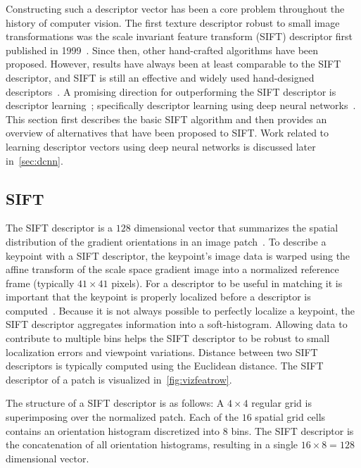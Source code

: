     Constructing such a descriptor vector has been a core problem throughout the history of computer vision.
    The first texture descriptor robust to small image transformations was the scale invariant feature
      transform (SIFT) descriptor first published in 1999~\cite{lowe_object_1999, lowe_distinctive_2004}.
    Since then, other hand-crafted algorithms have been proposed.
    However, results have always been at least comparable to the SIFT descriptor, and SIFT is still an effective
      and widely used hand-designed descriptors~\cite{mikolajczyk_performance_2005, calonder_brief_2010,
      bay_surf_2006, leutenegger_brisk_2011, alahi_freak_2012, jegou_triangulation_2014}.
    A promising direction for outperforming the SIFT descriptor is descriptor
      learning~\cite{simonyan_descriptor_2012, simonyan_learning_2014, winder_picking_2009}; specifically
      descriptor learning using deep neural networks~\cite{razavian_cnn_2014, bengio_representation_2013,
      russakovsky_imagenet_2014}.
    This section first describes the basic SIFT algorithm and then provides an overview of alternatives that have
      been proposed to SIFT{}.
    Work related to learning descriptor vectors using deep neural networks is discussed later in~\cref{sec:dcnn}.
      
    \subsection{SIFT}
        The {SIFT descriptor} is a $128$ dimensional vector that summarizes the spatial distribution of the
        gradient orientations in an image patch~\cite{lowe_distinctive_2004}. To describe a keypoint with a SIFT
        descriptor, the keypoint's image data is warped using the affine transform of the scale space gradient
        image into a normalized reference frame (typically $41 \times 41$ pixels). For a descriptor to be useful in
        matching it is important that the keypoint is properly localized before a descriptor is
        computed~\cite{ke_pca_sift_2004}. Because it is not always possible to perfectly localize a keypoint, the
        SIFT descriptor aggregates information into a soft-histogram. Allowing data to contribute to multiple bins
        helps the SIFT descriptor to be robust to small localization errors and viewpoint variations. Distance
        between two SIFT descriptors is typically computed using the Euclidean distance. The SIFT descriptor of a
        patch is visualized in~\cref{fig:vizfeatrow}.

        The structure of a SIFT descriptor is as follows: A $4\times4$ regular grid is superimposing over the
        normalized patch. Each of the $16$ spatial grid cells contains an orientation histogram discretized into
        $8$ bins. The SIFT descriptor is the concatenation of all orientation histograms, resulting in a single %
        $16 \times 8 = 128$ dimensional vector.

